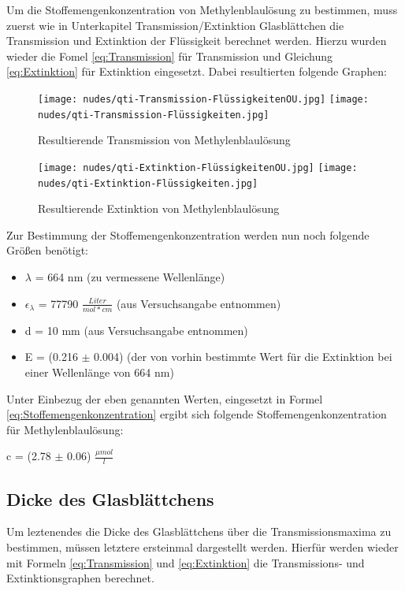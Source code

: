 \documentclass[12pt,a4paper,twoside]{article}
\begin{document}
Um die Stoffemengenkonzentration von Methylenblaulösung zu bestimmen, muss zuerst wie in Unterkapitel Transmission/Extinktion Glasblättchen die Transmission und Extinktion der Flüssigkeit berechnet werden.
Hierzu wurden wieder die Fomel \ref{eq:Transmission} für Transmission und Gleichung \ref{eq:Extinktion} für Extinktion eingesetzt. Dabei resultierten folgende Graphen:

\begin{figure}[H]
    \centering
    \texttt{[image: nudes/qti-Transmission-FlüssigkeitenOU.jpg]}
    \texttt{[image: nudes/qti-Transmission-Flüssigkeiten.jpg]}
    \caption{Resultierende Transmission von Methylenblaulösung}
    \label{fig:TransmissionFlüssigkeiten}
\end{figure}

\begin{figure}[H]
    \centering
    \texttt{[image: nudes/qti-Extinktion-FlüssigkeitenOU.jpg]}
    \texttt{[image: nudes/qti-Extinktion-Flüssigkeiten.jpg]}
    \caption{Resultierende Extinktion von Methylenblaulösung}
    \label{fig:ExtinktionFlüssigkeiten}
\end{figure}

\noindent
Zur Bestimmung der Stoffemengenkonzentration werden nun noch folgende Größen benötigt:

\begin{itemize}
    \item $\lambda$ = 664 nm (zu vermessene Wellenlänge)
    \item $\epsilon_{\lambda}$ = 77790 $\frac{Liter}{mol*cm}$ (aus Versuchsangabe entnommen)
    \item d = 10 mm (aus Versuchsangabe entnommen)
    \item E = (0.216 $\pm$ 0.004) (der von vorhin bestimmte Wert für die Extinktion bei einer Wellenlänge von 664 nm)
\end{itemize}

\noindent
Unter Einbezug der eben genannten Werten, eingesetzt in Formel \ref{eq:Stoffemengenkonzentration} ergibt sich folgende Stoffemengenkonzentration für Methylenblaulösung: \newline

\noindent
c = (2.78 $\pm$ 0.06) $\frac{\mu mol}{l}$


\subsection{Dicke des Glasblättchens}

Um leztenendes die Dicke des Glasblättchens über die Transmissionsmaxima zu bestimmen, müssen letztere ersteinmal dargestellt werden.
Hierfür werden wieder mit Formeln \ref{eq:Transmission} und \ref{eq:Extinktion} die Transmissions- und Extinktionsgraphen berechnet.
\end{document}
